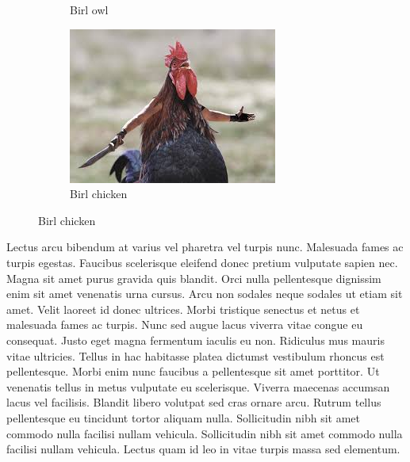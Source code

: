 \documentclass[12pt]{article}
\begin{document}
\begin{figure}[H]
\begin{subfigure}[b]{0.3\textwidth}
				\caption{Birl owl}
				\label{fig:birlowl}
			\end{subfigure}
			\quad
			\begin{subfigure}[b]{0.3\textwidth}
				\includegraphics[width=\linewidth]{figuras/birb_02c}
				\caption{Birl chicken}
				\label{fig:birlchicken}
			\end{subfigure}
			\label{fig:birb02}
		\end{figure}
	
		Lectus arcu bibendum at varius vel pharetra vel turpis nunc. Malesuada fames ac turpis egestas. Faucibus scelerisque eleifend donec pretium vulputate sapien nec. Magna sit amet purus gravida quis blandit. Orci nulla pellentesque dignissim enim sit amet venenatis urna cursus. Arcu non sodales neque sodales ut etiam sit amet. Velit laoreet id donec ultrices. Morbi tristique senectus et netus et malesuada fames ac turpis. Nunc sed augue lacus viverra vitae congue eu consequat. Justo eget magna fermentum iaculis eu non. Ridiculus mus mauris vitae ultricies. Tellus in hac habitasse platea dictumst vestibulum rhoncus est pellentesque. Morbi enim nunc faucibus a pellentesque sit amet porttitor. Ut venenatis tellus in metus vulputate eu scelerisque. Viverra maecenas accumsan lacus vel facilisis. Blandit libero volutpat sed cras ornare arcu. Rutrum tellus pellentesque eu tincidunt tortor aliquam nulla. Sollicitudin nibh sit amet commodo nulla facilisi nullam vehicula. Sollicitudin nibh sit amet commodo nulla facilisi nullam vehicula. Lectus quam id leo in vitae turpis massa sed elementum.
		\newpage
		
\end{document}
